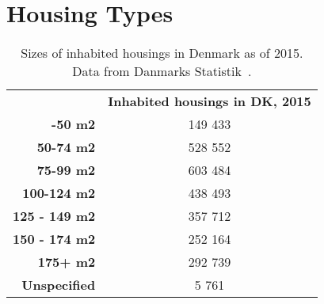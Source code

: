 \chapter{Housing Types}
\label{appendix:housing-types}

\begin{table}[ht]
\centering
\caption{Sizes of inhabited housings in Denmark as of 2015. Data from Danmarks Statistik~\cite{danmarksstatistik:housing-types}.}
\label{appendix:housing-types:table}
\begin{tabular}{rc}
\multicolumn{1}{l}{}  & \textbf{Inhabited housings in DK, 2015} \\
\textbf{-50 m2}       & 149 433                                \\
\textbf{50-74 m2}     & 528 552                                \\
\textbf{75-99 m2}     & 603 484                                \\
\textbf{100-124 m2}   & 438 493                                \\
\textbf{125 - 149 m2} & 357 712                                \\
\textbf{150 - 174 m2} & 252 164                                \\
\textbf{175+ m2}      & 292 739                                \\
\textbf{Unspecified}  & 5 761                                 
\end{tabular}
\end{table}

